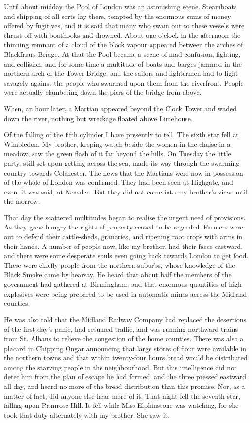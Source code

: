 Until about midday the Pool of London was an astonishing scene.
Steamboats and shipping of all sorts lay there, tempted by the
enormous sums of money offered by fugitives, and it is said that
many who swam out to these vessels were thrust off with boathooks
and drowned. About one o'clock in the afternoon the thinning
remnant of a cloud of the black vapour appeared between the arches
of Blackfriars Bridge. At that the Pool became a scene of mad
confusion, fighting, and collision, and for some time a multitude
of boats and barges jammed in the northern arch of the Tower
Bridge, and the sailors and lightermen had to fight savagely
against the people who swarmed upon them from the riverfront.
People were actually clambering down the piers of the bridge from
above.

When, an hour later, a Martian appeared beyond the Clock Tower and
waded down the river, nothing but wreckage floated above
Limehouse.

Of the falling of the fifth cylinder I have presently to tell. The
sixth star fell at Wimbledon. My brother, keeping watch beside the
women in the chaise in a meadow, saw the green flash of it far
beyond the hills. On Tuesday the little party, still set upon
getting across the sea, made its way through the swarming country
towards Colchester. The news that the Martians were now in
possession of the whole of London was confirmed. They had been seen
at Highgate, and even, it was said, at Neasden. But they did not
come into my brother's view until the morrow.

That day the scattered multitudes began to realise the urgent need
of provisions. As they grew hungry the rights of property ceased to
be regarded. Farmers were out to defend their cattle-sheds,
granaries, and ripening root crops with arms in their hands. A
number of people now, like my brother, had their faces eastward,
and there were some desperate souls even going back towards London
to get food. These were chiefly people from the northern suburbs,
whose knowledge of the Black Smoke came by hearsay. He heard that
about half the members of the government had gathered at
Birmingham, and that enormous quantities of high explosives were
being prepared to be used in automatic mines across the Midland
counties.

He was also told that the Midland Railway Company had replaced the
desertions of the first day's panic, had resumed traffic, and was
running northward trains from St. Albans to relieve the congestion
of the home counties. There was also a placard in Chipping Ongar
announcing that large stores of flour were available in the
northern towns and that within twenty-four hours bread would be
distributed among the starving people in the neighbourhood. But
this intelligence did not deter him from the plan of escape he had
formed, and the three pressed eastward all day, and heard no more
of the bread distribution than this promise. Nor, as a matter of
fact, did anyone else hear more of it. That night fell the seventh
star, falling upon Primrose Hill. It fell while Miss Elphinstone
was watching, for she took that duty alternately with my brother.
She saw it.

